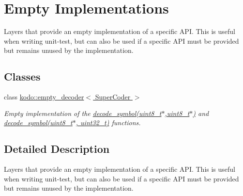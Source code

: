 \hypertarget{group__empty}{\section{Empty Implementations}
\label{group__empty}
}


Layers that provide an empty implementation of a specific A\-P\-I. This is useful when writing unit-\/test, but can also be used if a specific A\-P\-I must be provided but remains unused by the implementation.  


\subsection*{Classes}
\begin{DoxyCompactItemize}
\item 
class \hyperlink{classkodo_1_1empty__decoder}{kodo\-::empty\-\_\-decoder$<$ Super\-Coder $>$}
\begin{DoxyCompactList}\small\item\em Empty implementation of the \hyperlink{classkodo_1_1empty__decoder_aa700bffb25d17e3e2c819d36ed61308a}{decode\-\_\-symbol(uint8\-\_\-t$\ast$,uint8\-\_\-t$\ast$)} and \hyperlink{classkodo_1_1empty__decoder_aac8f8c663ddeaf9700d1a0fc50674462}{decode\-\_\-symbol(uint8\-\_\-t$\ast$, uint32\-\_\-t)} functions. \end{DoxyCompactList}\end{DoxyCompactItemize}


\subsection{Detailed Description}
Layers that provide an empty implementation of a specific A\-P\-I. This is useful when writing unit-\/test, but can also be used if a specific A\-P\-I must be provided but remains unused by the implementation. 